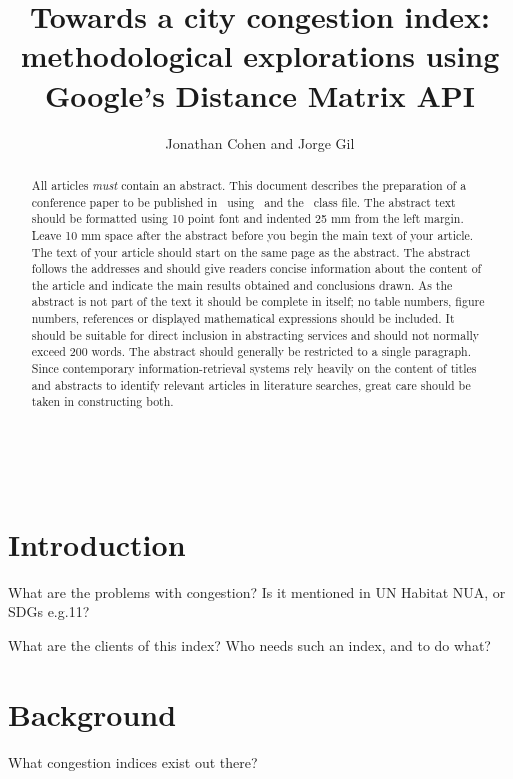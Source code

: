 \documentclass[a4paper]{jpconf}
\begin{document}
\title{Towards a city congestion index: methodological explorations using Google's Distance Matrix API}

\author{Jonathan Cohen and Jorge Gil}

\address{Chalmers University of Technology, Sven Hultins gata 6, SE-412 96, Göteborg, Sweden}





\begin{abstract}
	All articles {\it must} contain an abstract. This document describes the  preparation of a conference paper to be published in \jpcs\ using \LaTeXe\ and the \cls\ class file. The abstract text should be formatted using 10 point font and indented 25 mm from the left margin. Leave 10 mm space after the abstract before you begin the main text of your article. The text of your article should start on the same page as the abstract. The abstract follows the addresses and should give readers concise information about the content of the article and indicate the main results obtained and conclusions drawn. As the abstract is not part of the text it should be complete in itself; no table numbers, figure numbers, references or displayed mathematical expressions should be included. It should be suitable for direct inclusion in abstracting services and should not normally exceed 200 words. The abstract should generally be restricted to a single paragraph. Since contemporary information-retrieval systems rely heavily on the content of titles and abstracts to identify relevant articles in literature searches, great care should be taken in constructing both.
\end{abstract}

\

\section{Introduction}
\indent What are the problems with congestion? Is it mentioned in UN Habitat NUA, or SDGs e.g.11?\par
\indent What are the clients of this index? Who needs such an index, and to do what?\par

\section{Background}

\indent What congestion indices exist out there? 
\end{document}
